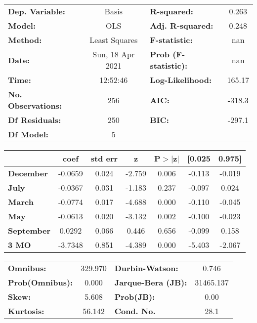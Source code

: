 \begin{center}
\begin{tabular}{lclc}
\toprule
\textbf{Dep. Variable:}    &      Basis       & \textbf{  R-squared:         } &     0.263   \\
\textbf{Model:}            &       OLS        & \textbf{  Adj. R-squared:    } &     0.248   \\
\textbf{Method:}           &  Least Squares   & \textbf{  F-statistic:       } &       nan   \\
\textbf{Date:}             & Sun, 18 Apr 2021 & \textbf{  Prob (F-statistic):} &      nan    \\
\textbf{Time:}             &     12:52:46     & \textbf{  Log-Likelihood:    } &    165.17   \\
\textbf{No. Observations:} &         256      & \textbf{  AIC:               } &    -318.3   \\
\textbf{Df Residuals:}     &         250      & \textbf{  BIC:               } &    -297.1   \\
\textbf{Df Model:}         &           5      & \textbf{                     } &             \\
\bottomrule
\end{tabular}
\begin{tabular}{lcccccc}
                   & \textbf{coef} & \textbf{std err} & \textbf{z} & \textbf{P$> |$z$|$} & \textbf{[0.025} & \textbf{0.975]}  \\
\midrule
\textbf{December}  &      -0.0659  &        0.024     &    -2.759  &         0.006        &       -0.113    &       -0.019     \\
\textbf{July}      &      -0.0367  &        0.031     &    -1.183  &         0.237        &       -0.097    &        0.024     \\
\textbf{March}     &      -0.0774  &        0.017     &    -4.688  &         0.000        &       -0.110    &       -0.045     \\
\textbf{May}       &      -0.0613  &        0.020     &    -3.132  &         0.002        &       -0.100    &       -0.023     \\
\textbf{September} &       0.0292  &        0.066     &     0.446  &         0.656        &       -0.099    &        0.158     \\
\textbf{3 MO}      &      -3.7348  &        0.851     &    -4.389  &         0.000        &       -5.403    &       -2.067     \\
\bottomrule
\end{tabular}
\begin{tabular}{lclc}
\textbf{Omnibus:}       & 329.970 & \textbf{  Durbin-Watson:     } &     0.746  \\
\textbf{Prob(Omnibus):} &   0.000 & \textbf{  Jarque-Bera (JB):  } & 31465.137  \\
\textbf{Skew:}          &   5.608 & \textbf{  Prob(JB):          } &      0.00  \\
\textbf{Kurtosis:}      &  56.142 & \textbf{  Cond. No.          } &      28.1  \\
\bottomrule
\end{tabular}
\end{center}

